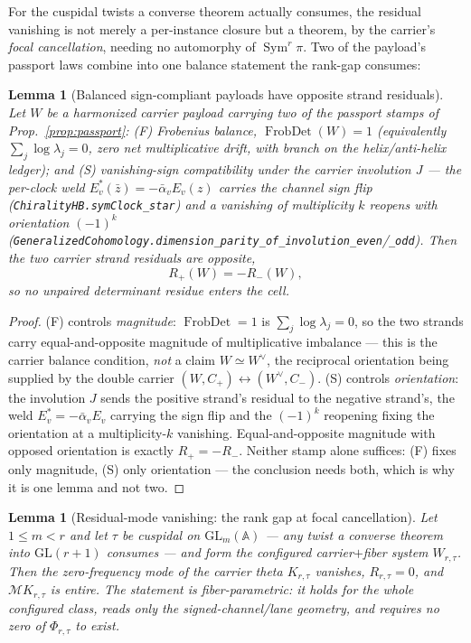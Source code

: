 \documentclass[11pt]{article}
\newtheorem{lemma}[theorem]{Lemma}
\theoremstyle{definition}
\newcommand{\Sym}{\operatorname{Sym}}
\begin{document}
For the cuspidal twists a converse theorem actually consumes, the residual vanishing is not merely a
per-instance closure but a theorem, by the carrier's \emph{focal cancellation}, needing no automorphy of
$\Sym^r\pi$. Two of the payload's passport laws combine into one balance statement the rank-gap consumes:

\begin{lemma}[Balanced sign-compliant payloads have opposite strand residuals]\label{lem:signcomp}
Let $W$ be a harmonized carrier payload carrying two of the passport stamps of
Prop.~\ref{prop:passport}: \textup{(F)} \emph{Frobenius balance}, $\operatorname{FrobDet}(W)=1$
(equivalently $\sum_j\log\lambda_j=0$, zero net multiplicative drift, with branch on the helix/anti-helix
ledger); and \textup{(S)} \emph{vanishing-sign compatibility} under the carrier involution $J$ --- the
per-clock weld $E_v^{*}(\bar z)=-\bar\alpha_v E_v(z)$ carries the channel sign flip
(\texttt{ChiralityHB.symClock\_star}) and a vanishing of multiplicity $k$ reopens with orientation $(-1)^k$
(\texttt{GeneralizedCohomology.dimension\_parity\_of\_involution\_even}/\texttt{\_odd}). Then the two carrier
strand residuals are opposite,
\[
  R_+(W)=-R_-(W),
\]
so no unpaired determinant residue enters the cell.
\end{lemma}

\begin{proof}
\textup{(F)} controls \emph{magnitude}: $\operatorname{FrobDet}=1$ is $\sum_j\log\lambda_j=0$, so the two
strands carry equal-and-opposite magnitude of multiplicative imbalance --- this is the carrier balance
condition, \emph{not} a claim $W\simeq W^\vee$, the reciprocal orientation being supplied by the double
carrier $(W,C_+)\leftrightarrow(W^\vee,C_-)$. \textup{(S)} controls \emph{orientation}: the involution $J$
sends the positive strand's residual to the negative strand's, the weld $E_v^{*}=-\bar\alpha_v E_v$ carrying
the sign flip and the $(-1)^k$ reopening fixing the orientation at a multiplicity-$k$ vanishing. Equal-and-opposite magnitude with opposed orientation is exactly $R_+=-R_-$. Neither stamp alone suffices: (F) fixes
only magnitude, (S) only orientation --- the conclusion needs both, which is why it is one lemma and not two.
\end{proof}

\begin{lemma}[Residual-mode vanishing: the rank gap at focal cancellation]\label{lem:rankgap}
Let $1\le m<r$ and let $\tau$ be cuspidal on $\mathrm{GL}_m(\mathbb A)$ --- any twist a converse theorem
into $\mathrm{GL}(r+1)$ consumes --- and form the configured carrier$+$fiber system $W_{r,\tau}$. Then the
zero-frequency mode of the carrier theta $K_{r,\tau}$ vanishes, $R_{r,\tau}=0$, and
$\mathcal M K_{r,\tau}$ is entire. The statement is \emph{fiber-parametric}: it holds for the whole
configured class, reads only the signed-channel/lane geometry, and requires no zero of $\Phi_{r,\tau}$ to
exist.
\end{lemma}
\end{document}
